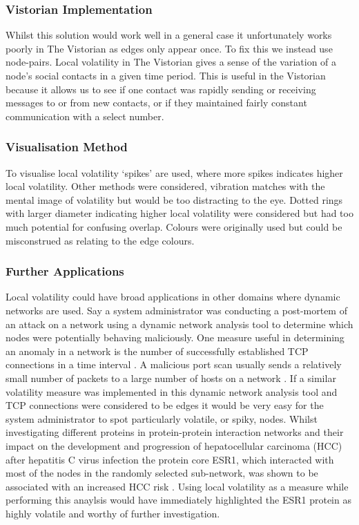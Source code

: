 \subsubsection{Vistorian Implementation}
Whilst this solution would work well in a general case it unfortunately works poorly in The Vistorian as edges only appear once. To fix this we instead use node-pairs. 
Local volatility in The Vistorian gives a sense of the variation of a node's social contacts in a given time period. This is useful in the Vistorian because it allows us to see if one contact was rapidly sending or receiving messages to or from new contacts, or if they maintained fairly constant communication with a select number. 

\subsubsection{Visualisation Method}
To visualise local volatility ‘spikes’ are used, where more spikes indicates higher local volatility. Other methods were considered, vibration matches with the mental image of volatility but would be too distracting to the eye. Dotted rings with larger diameter indicating higher local volatility were considered but had too much potential for confusing overlap. Colours were originally used but could be misconstrued as relating to the edge colours. 


\subsubsection{Further Applications}
Local volatility could have broad applications in other domains where dynamic networks are used. 
\newline\newline
Say a system administrator was conducting a post-mortem of an attack on a network using a dynamic network analysis tool to determine which nodes were potentially behaving maliciously. One measure useful in determining an anomaly in a network is the number of successfully established TCP connections in a time interval \cite{fnpfid}. A malicious port scan usually sends a relatively small number of packets to a large number of hosts on a network \cite{fnpfid}. If a similar volatility measure was implemented in this dynamic network analysis tool and TCP connections were considered to be edges it would be very easy for the system administrator to spot particularly volatile, or spiky, nodes.
\newline\newline
Whilst investigating different proteins in protein-protein interaction networks and their impact on the development and progression of hepatocellular carcinoma (HCC) after hepatitis C virus infection the protein core ESR1, which interacted with most of the nodes in the randomly selected sub-network, was shown to be associated with an increased HCC risk \cite{acaotdbnihih}. Using local volatility as a measure while performing this anaylsis would have immediately highlighted the ESR1 protein as highly volatile and worthy of further investigation.

